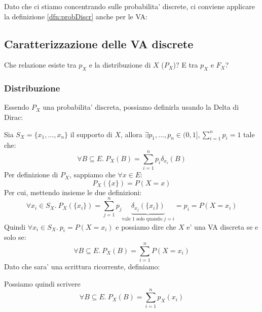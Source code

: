  Dato che ci stiamo concentrando sulle probabilita' discrete, ci conviene applicare la definizione \ref{dfn:probDiscr} anche per le VA:


 \subsection{Caratterizzazione delle VA discrete}
 Che relazione esiste tra $ p_X $ e la distribuzione di $ X $ ($ P_X $)? E tra $ p_X $ e $ F_X $?
 \subsubsection{Distribuzione}
 Essendo $ P_X $ una probabilita' discreta, possiamo definirla usando la Delta di Dirac:

 Sia $ S_X = \{x_1,...,x_n\} $ il supporto di $ X $, allora $ \exists p_1,...,p_n \in (0,1], \sum_{i=1}^{n} p_i = 1 $ tale che:
 \[
   \forall B \subseteq E.\ P_X(B) = \sum_{i=1}^{n} p_i \delta_{x_i}(B)
 \]
 Per definizione di $ P_X $, sappiamo che $ \forall x \in E $:
 \[
   P_X(\{x\}) = P(X = x)
 \]
 Per cui, mettendo insieme le due definizioni:
 \[
   \forall x_i \in S_X.\ P_X(\{x_i\}) = \sum_{j=1}^{n} p_j \underbrace{\delta_{x_j}(\{x_i\})}_{\text{vale 1 solo quando } j = i} = p_i = P(X = x_i)
 \]
 Quindi $ \forall x_i \in S_X.\  p_i = P(X = x_i) $ e possiamo dire che $ X $ e' una VA discreta se e solo se:
 \[
   \forall B \subseteq E.\ P_X(B) = \sum_{i=1}^{n} P(X = x_i)
 \]
Dato che sara' una scrittura ricorrente, definiamo:

Possiamo quindi scrivere
\[
  \forall B \subseteq E.\ P_X(B) = \sum_{i=1}^{n} p_X(x_i)
\]
 
